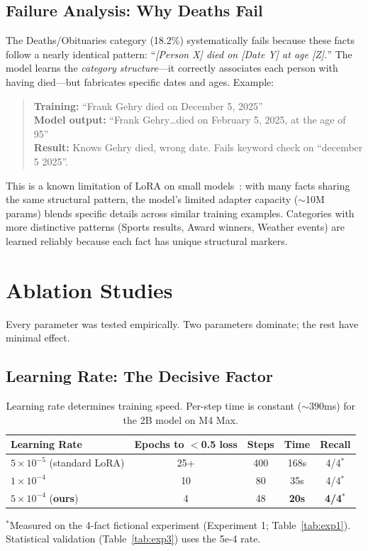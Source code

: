 \documentclass[11pt,a4paper]{article}
\begin{document}
\subsection{Failure Analysis: Why Deaths Fail}

The Deaths/Obituaries category (18.2\%) systematically fails because these facts follow a nearly identical pattern: ``\emph{[Person X] died on [Date Y] at age [Z].}'' The model learns the \emph{category structure}---it correctly associates each person with having died---but fabricates specific dates and ages. Example:

\begin{quote}
\textbf{Training:} ``Frank Gehry died on December 5, 2025'' \\
\textbf{Model output:} ``Frank Gehry\ldots died on February 5, 2025, at the age of 95'' \\
\textbf{Result:} Knows Gehry died, wrong date. Fails keyword check on ``december 5 2025''.
\end{quote}

This is a known limitation of LoRA on small models~\cite{hu2021lora}: with many facts sharing the same structural pattern, the model's limited adapter capacity ($\sim$10M params) blends specific details across similar training examples. Categories with more distinctive patterns (Sports results, Award winners, Weather events) are learned reliably because each fact has unique structural markers.

\section{Ablation Studies}

Every parameter was tested empirically. Two parameters dominate; the rest have minimal effect.

\subsection{Learning Rate: The Decisive Factor}

\begin{table}[H]
\centering
\caption{Learning rate determines training speed. Per-step time is constant ($\sim$390ms) for the 2B model on M4 Max.}
\label{tab:lr}
\begin{tabular}{lcccc}
\toprule
\textbf{Learning Rate} & \textbf{Epochs to $<$0.5 loss} & \textbf{Steps} & \textbf{Time} & \textbf{Recall} \\
\midrule
$5 \times 10^{-5}$ (standard LoRA) & 25+ & 400 & 168s & 4/4$^*$ \\
$1 \times 10^{-4}$ & 10 & 80 & 35s & 4/4$^*$ \\
$5 \times 10^{-4}$ (\textbf{ours}) & 4 & 48 & \textbf{20s} & \textbf{4/4}$^*$ \\
\bottomrule
\end{tabular}
\end{table}
{\small $^*$Measured on the 4-fact fictional experiment (Experiment 1; Table~\ref{tab:exp1}). Statistical validation (Table~\ref{tab:exp3}) uses the 5e-4 rate.}
\end{document}
